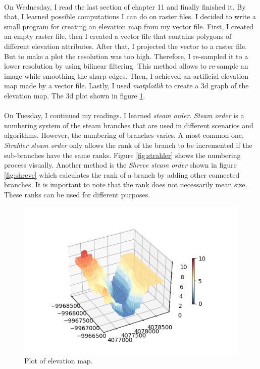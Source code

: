 \documentclass[a4paper]{article}
\begin{document}
    \paragraph{}
    On Wednesday, I read the last section of chapter 11 and finally finished it. By that, I learned possible computations I can do on raster files. I decided to write a small program for creating an elevation map from my vector file. First, I created an empty raster file, then I created a vector file that contains polygons of different elevation attributes. After that, I projected the vector to a raster file. But to make a plot the resolution was too high. Therefore, I re-sampled it to a lower resolution by using bilinear filtering. This method allows to re-sample an image while smoothing the sharp edges\cite{geobook}. Then, I achieved an artificial elevation map made by a vector file. Lastly, I used \textit{matplotlib} to create a 3d graph of the elevation map. The 3d plot shown in figure \ref{fig:plot}.
    
    \paragraph{}
    On Tuesday, I continued my readings. I learned \textit{steam order}. \textit{Steam order} is a numbering system of the steam branches that are used in different scenarios and algorithms. However, the numbering of branches varies. A most common one, \textit{Strahler steam order} only allows the rank of the branch to be incremented if the sub-branches have the same ranks. Figure \ref{fig:strahler} shows the numbering process visually. Another method is the \textit{Shreve steam order} shown in figure \ref{fig:shreve} which calculates the rank of a branch by adding other connected branches. It is important to note that the rank does not necessarily mean size. These ranks can be used for different purposes.
    
    \begin{figure}
        \includegraphics[width=\linewidth]{plot3.png}
        \caption{Plot of elevation map.}
        \label{fig:plot}
    \end{figure}
\end{document}
